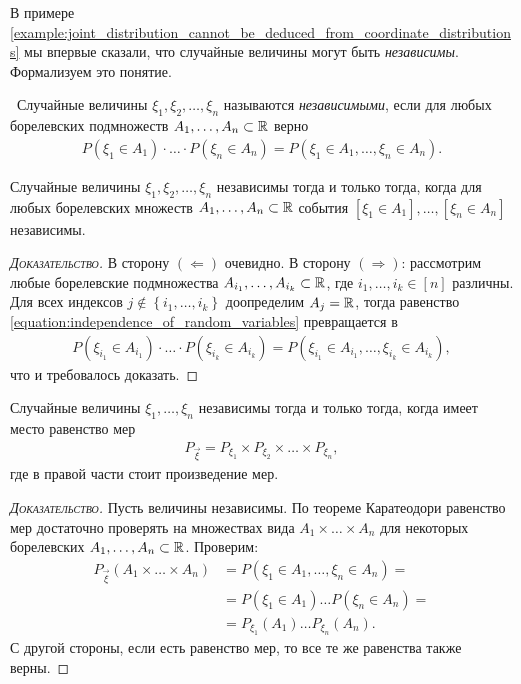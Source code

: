 \documentclass[../main.tex]{subfiles}
\begin{document}
В примере \ref{example:joint_distribution_cannot_be_deduced_from_coordinate_distributions} мы впервые сказали, что случайные величины могут быть \textit{независимы}. Формализуем это понятие.

\begin{df}\
 Случайные величины $ \xi_1, \xi_2, \ldots, \xi_n$ называются \textit{независимыми}, если для любых борелевских подмножеств $ A_1, \ldots, A_n \subset \mathbb{R} $ верно
 \begin{align}
  \label{equation:independence_of_random_variables}
  P(\xi_1 \in A_1) \cdot \ldots \cdot P(\xi_n \in A_n) = P(\xi_1 \in A_1, \ldots, \xi_n \in A_n).
 \end{align}
\end{df}
\begin{claim*}
 Случайные величины $ \xi_1, \xi_2, \ldots, \xi_n $ независимы тогда и только тогда, когда для любых борелевских множеств $ A_1, \ldots, A_n \subset \mathbb{R} $ события $ [\xi_1 \in A_1], \ldots, [\xi_n \in A_n] $ независимы.
\end{claim*}
\begin{proof}[\normalfont\textsc{Доказательство}]
 В сторону $(\Longleftarrow)$ очевидно. В сторону $(\Longrightarrow)$: рассмотрим любые борелевские подмножества $ A_{i_1}, \ldots, A_{i_k} \subset \mathbb{R} $, где $ i_1, \ldots, i_k \in [n] $ различны. Для всех индексов $ j \notin \left\{ i_1, \ldots, i_k \right\} $ доопределим $ A_j = \mathbb{R} $, тогда равенство \eqref{equation:independence_of_random_variables} превращается в
 \begin{align*}
  P(\xi_{i_1} \in A_{i_1}) \cdot \ldots \cdot P(\xi_{i_k} \in A_{i_k}) = P(\xi_{i_1} \in A_{i_1}, \ldots, \xi_{i_k} \in A_{i_k}),
 \end{align*} что и требовалось доказать.
\end{proof}

\begin{thm}
 \label{theorem:random_variable_independence_through_distribution_measure_eq}
 Случайные величины $ \xi_1, \ldots, \xi_n $ независимы тогда и только тогда, когда имеет место равенство мер
 \begin{align}
  \label{equation:random_variable_independence_through_distribution_measure_eq}
  P_{\vec\xi} = P_{\xi_1} \times P_{\xi_2} \times \ldots \times P_{\xi_n},
 \end{align} где в правой части стоит произведение мер.
\end{thm}
\begin{proof}[\normalfont\textsc{Доказательство}]
 Пусть величины независимы. По теореме Каратеодори равенство мер достаточно проверять на множествах вида $ A_1 \times \ldots \times A_n $ для некоторых борелевских $ A_1, \ldots, A_n \subset \mathbb{R} $. Проверим:
 \begin{align*}
  P_{\vec\xi}(A_1 \times \ldots \times A_n) &= P(\xi_1 \in A_1, \ldots, \xi_n \in A_n) =  \\
  &= P(\xi_1 \in A_1) \ldots P(\xi_n \in A_n) = \\
  &= P_{\xi_1}(A_1) \ldots P_{\xi_n}(A_n).
 \end{align*} С другой стороны, если есть равенство мер, то все те же равенства также верны.
\end{proof}
\end{document}
